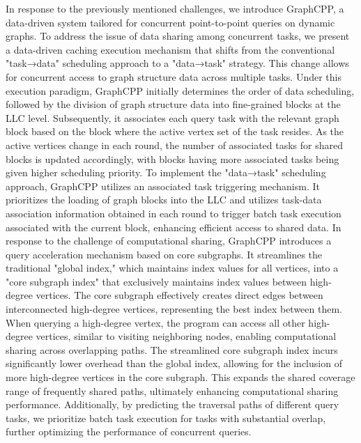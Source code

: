 \documentclass[lettersize,journal]{IEEEtran} %
\begin{document}
In response to the previously mentioned challenges, we introduce GraphCPP, a data-driven system tailored for concurrent point-to-point queries on dynamic graphs. To address the issue of data sharing among concurrent tasks, we present a data-driven caching execution mechanism that shifts from the conventional "task→data" scheduling approach to a "data→task" strategy. This change allows for concurrent access to graph structure data across multiple tasks. Under this execution paradigm, GraphCPP initially determines the order of data scheduling, followed by the division of graph structure data into fine-grained blocks at the LLC level. Subsequently, it associates each query task with the relevant graph block based on the block where the active vertex set of the task resides. As the active vertices change in each round, the number of associated tasks for shared blocks is updated accordingly, with blocks having more associated tasks being given higher scheduling priority. To implement the "data→task" scheduling approach, GraphCPP utilizes an associated task triggering mechanism. It prioritizes the loading of graph blocks into the LLC and utilizes task-data association information obtained in each round to trigger batch task execution associated with the current block, enhancing efficient access to shared data. In response to the challenge of computational sharing, GraphCPP introduces a query acceleration mechanism based on core subgraphs. It streamlines the traditional "global index," which maintains index values for all vertices, into a "core subgraph index" that exclusively maintains index values between high-degree vertices. The core subgraph effectively creates direct edges between interconnected high-degree vertices, representing the best index between them. When querying a high-degree vertex, the program can access all other high-degree vertices, similar to visiting neighboring nodes, enabling computational sharing across overlapping paths. The streamlined core subgraph index incurs significantly lower overhead than the global index, allowing for the inclusion of more high-degree vertices in the core subgraph. This expands the shared coverage range of frequently shared paths, ultimately enhancing computational sharing performance. Additionally, by predicting the traversal paths of different query tasks, we prioritize batch task execution for tasks with substantial overlap, further optimizing the performance of concurrent queries.
\end{document}
